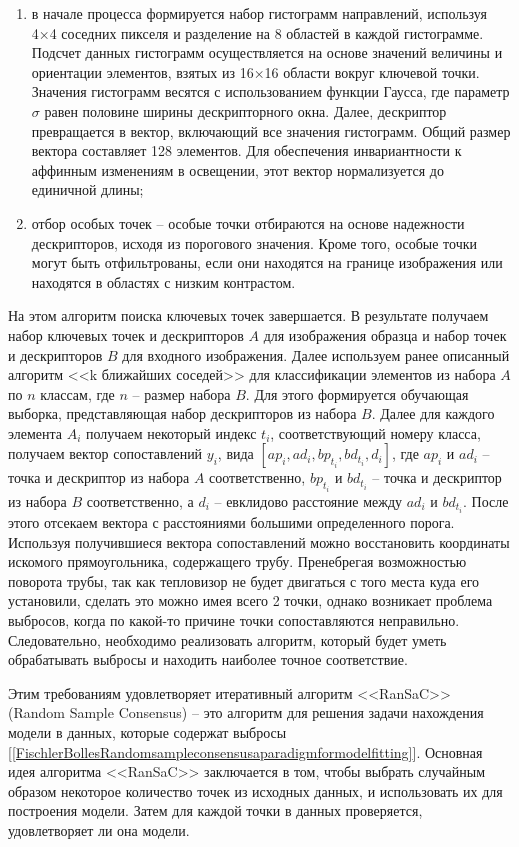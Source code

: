 \documentclass[14pt, a4paper]{extreport}
\begin{document}
\begin{enumerate}[label={\arabic*)}]
		\item в начале процесса формируется набор гистограмм направлений, используя 4×4 соседних пикселя и разделение на 8 областей в каждой гистограмме. Подсчет данных гистограмм осуществляется на основе значений величины и ориентации элементов, взятых из 16×16 области вокруг ключевой точки. Значения гистограмм весятся с использованием функции Гаусса, где параметр $\sigma$ равен половине ширины дескрипторного окна. Далее, дескриптор превращается в вектор, включающий все значения гистограмм. Общий размер вектора составляет 128 элементов. Для обеспечения инвариантности к аффинным изменениям в освещении, этот вектор нормализуется до единичной длины;
		
		\item отбор особых точек -- особые точки отбираются на основе надежности дескрипторов, исходя из порогового значения. Кроме того, особые точки могут быть отфильтрованы, если они находятся на границе изображения или находятся в областях с низким контрастом.
	\end{enumerate}
	
	На этом алгоритм поиска ключевых точек завершается. 
	В результате получаем набор ключевых точек и дескрипторов $A$ для изображения образца и набор точек и дескрипторов $B$ для входного изображения. Далее используем ранее описанный алгоритм <<k ближайших соседей>> для классификации элементов из набора $A$ по $n$ классам, где $n$ -- размер набора $B$. Для этого формируется обучающая выборка, представляющая набор дескрипторов из набора $B$. Далее для каждого элемента $A_i$ получаем некоторый индекс $t_i$, соответствующий номеру класса, получаем вектор сопоставлений $y_i$, вида $[ap_i, ad_i, bp_{t_i}, bd_{t_i}, d_i]$, где $ap_i$ и $ad_i$ -- точка и дескриптор из набора $A$ соответственно, $bp_{t_i}$ и $bd_{t_i}$ -- 
	точка и дескриптор из набора $B$ соответственно, а $d_i$ -- евклидово расстояние между $ad_i$ и $bd_{t_i}$. После этого отсекаем вектора с расстояниями большими определенного порога.
	Используя получившиеся вектора сопоставлений можно восстановить координаты искомого прямоугольника, содержащего трубу. Пренебрегая возможностью поворота трубы, так как тепловизор не будет двигаться с того места куда его установили, сделать это можно имея всего 2 точки, однако возникает проблема выбросов, когда по какой-то причине точки сопоставляются неправильно. Следовательно, необходимо реализовать алгоритм, который будет уметь обрабатывать выбросы и находить наиболее точное соответствие.
	
	Этим требованиям удовлетворяет итеративный алгоритм <<RanSaC>> (Random Sample Consensus) -- это алгоритм для решения задачи нахождения модели в данных, которые содержат выбросы [\ref{FischlerBollesRandomsampleconsensusaparadigmformodelfitting}]. Основная идея алгоритма <<RanSaC>> заключается в том, чтобы выбрать случайным образом некоторое количество точек из исходных данных, и использовать их для построения модели. Затем для каждой точки в данных проверяется, удовлетворяет ли она модели. 
	
\end{document}
